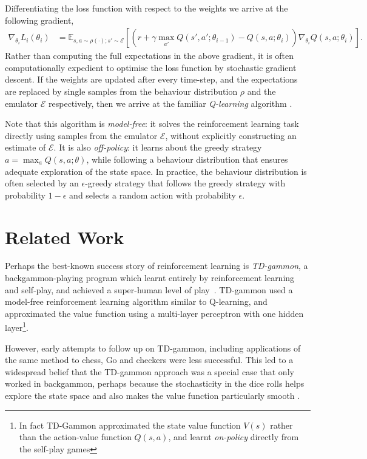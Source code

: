 Differentiating the loss function with respect to the weights we arrive at the following gradient,
%
\begin{align}
\nabla_{\theta_i} L_i\left(\theta_i\right) &= \mathbb{E}_{s,a \sim \rho(\cdot); s' \sim \mathcal{E}} \left[ \left( r + \gamma \max_{a'} Q(s', a'; \theta_{i-1}) - Q(s,a ; \theta_i ) \right) \nabla_{\theta_i} Q(s,a;\theta_{i}) \right] .
\label{eq:q-learning-gradient}
\end{align}
%
Rather than computing the full expectations in the above gradient, it is often computationally expedient to optimise the loss function by stochastic gradient descent. If the weights are updated after every time-step, and the expectations are replaced by single samples from the behaviour distribution $\rho$ and the emulator $\mathcal{E}$ respectively, then we arrive at the familiar \emph{Q-learning} algorithm \cite{watkins-qlearning}. 

Note that this algorithm is \emph{model-free}: it solves the reinforcement learning task directly using samples from the emulator $\mathcal{E}$, without explicitly constructing an estimate of $\mathcal{E}$. It is also \emph{off-policy}: it learns about the greedy strategy $a = \max_{a} Q(s,a;\theta)$, while following a behaviour distribution that ensures adequate exploration of the state space. In practice, the behaviour distribution is often selected by an $\epsilon$-greedy strategy that follows the greedy strategy with probability $1 - \epsilon$ and selects a random action with probability $\epsilon$.

\section{Related Work}

Perhaps the best-known success story of reinforcement learning is \emph{TD-gammon}, a backgammon-playing program which learnt entirely by reinforcement learning and self-play, and achieved a super-human level of play~\cite{tesauro-95-backgammon}. TD-gammon used a model-free reinforcement learning algorithm similar to Q-learning, and approximated the value function using a multi-layer perceptron with one hidden layer\footnote{In fact TD-Gammon approximated the state value function $V(s)$ rather than the action-value function $Q(s,a)$, and learnt \emph{on-policy} directly from the self-play games}. 

However, early attempts to follow up on TD-gammon, including applications of the same method to chess, Go and checkers were less successful. This led to a widespread belief that the TD-gammon approach was a special case that only worked in backgammon, perhaps because the stochasticity in the dice rolls helps explore the state space and also makes the value function particularly smooth \cite{pollack:td-gammon}.

